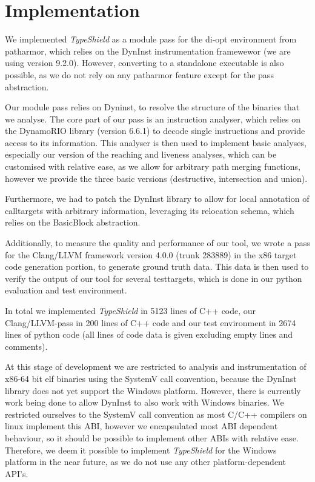 \section{Implementation}
\label{chapter:Implementation}

We implemented \textit{TypeShield} as a module pass for the di-opt environment from patharmor\cite{veen:cfi}, which relies on the DynInst \cite{bernat:dyninst} instrumentation framewewor (we are using version 9.2.0). However, converting to a standalone executable is also possible, as we do not rely on any patharmor feature except for the pass abstraction.

Our module pass relies on Dyninst, to resolve the structure of the binaries that we analyse. The core part of our pass is an instruction analyser, which relies on the DynamoRIO \cite{dynamorio:drmemory} library (version 6.6.1) to decode single instructions and provide access to its information. This analyser is then used to implement basic analyses, especially our version of the reaching and liveness analyses, which can be customised with relative ease, as we allow for arbitrary path merging functions, however we provide the three basic versions (destructive, intersection and union).

Furthermore, we had to patch the DynInst library to allow for local annotation of calltargets with arbitrary information, leveraging its relocation schema, which relies on the BasicBlock abstraction.

Additionally, to measure the quality and performance of our tool, we wrote a pass for the Clang/LLVM framework version 4.0.0 (trunk 283889) in the x86 target code generation portion, to generate ground truth data. This data is then used to verify the output of our tool for several testtargets, which is done in our python evaluation and test environment.

In total we implemented \textit{TypeShield} in 5123 lines of C++ code, our Clang/LLVM-pass in 200 lines of C++ code and our test environment in 2674 lines of python code (all lines of code data is given excluding empty lines and comments).

At this stage of development we are restricted to analysis and instrumentation of x86-64 bit elf binaries using the SystemV call convention, because the DynInst library does not yet support the Windows platform. However, there is currently work being done to allow DynInst to also work with Windows binaries. We restricted ourselves to the SystemV call convention as most C/C++ compilers on linux implement this ABI, however we encapsulated most ABI dependent behaviour, so it should be possible to implement other ABIs with relative ease. Therefore, we deem it possible to implement \textit{TypeShield} for the Windows platform in the near future, as we do not use any other platform-dependent API's. 

